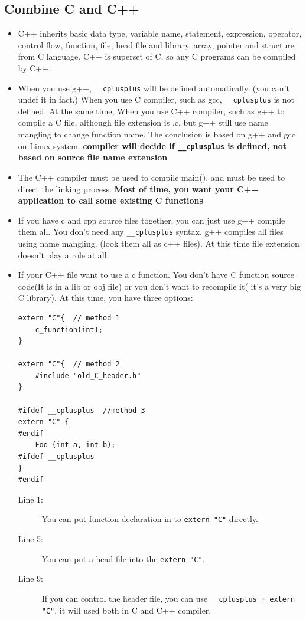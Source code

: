 \documentclass[a4paper,11pt,twoside]{book}
\begin{document}
\subsection{Combine C and C++}
\begin{itemize}
	
	\item C++ inherits basic data type, variable name, statement, expression, operator, control flow, function, file, head file and library, array, pointer and structure from C language. C++ is superset of C, so any C programs can be compiled by C++.
	
	\item When you use g++,  \texttt{\_\_cplusplus} will be defined automatically. (you can't undef it in fact.) When you use C compiler, such as gcc, \texttt{\_\_cplusplus} is not defined. At the same time, When you use C++ compiler, such as g++ to compile a C file, although file extension is .c, but g++ still use name mangling to change function name.  The conclusion is based on g++ and gcc on Linux system. \textbf{compiler will decide if \texttt{\_\_cplusplus} is defined, not based on source file name extension}
	
	\item The C++ compiler must be used to compile main(), and must be used to direct the linking process. \textbf{Most of time, you want your C++ application to call some existing C functions}
	
	\item If you have c and cpp source files together, you can just use g++ compile them all. You don't need any \texttt{\_\_cplusplus} syntax.  g++ compiles all files using name mangling. (look them all as c++ files). At this time file extension doesn't play a role at all.
	
	\item If your C++ file want to use a c function. You don't have C function source code(It is in a lib or obj file) or you don't want to recompile it( it's a very big C library). At this time, you have three options:
	

\begin{lstlisting}
extern "C"{  // method 1
	c_function(int);
}
	
extern "C"{  // method 2
	#include "old_C_header.h"
}
	
#ifdef __cplusplus  //method 3
extern "C" {
#endif
	Foo (int a, int b);
#ifdef __cplusplus
}
#endif
\end{lstlisting}
	\begin{description}
	\item[Line 1:] You can put function declaration in to \texttt{extern "C"} directly.
	\item[Line 5:] You can put a head file into the \texttt{extern "C"}.
	\item[Line 9:] If you can control the header file, you can use \texttt{\_\_cplusplus + extern "C"}. it will used both in C and C++ compiler.
\end{description}


\end{itemize}
\end{document}
